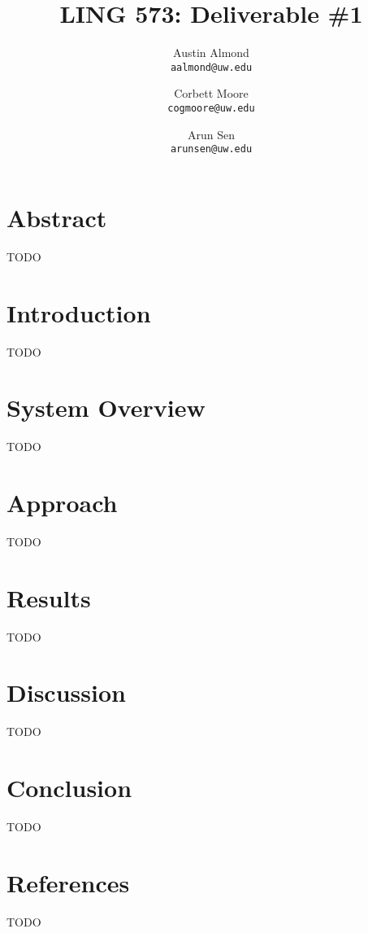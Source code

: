 \documentclass{article}
\title{LING 573: Deliverable \#1}
\author{
	Austin Almond\\
	\texttt{aalmond@uw.edu}
	\and
	Corbett Moore\\
	\texttt{cogmoore@uw.edu}
	\and
	Arun Sen\\
	\texttt{arunsen@uw.edu}
}
\begin{document}
	\maketitle

	\section*{Abstract}

	TODO

	\section*{Introduction}

	TODO

	\section*{System Overview}

	TODO

	\section*{Approach}

	TODO

	\section*{Results}

	TODO

	\section*{Discussion}

	TODO

	\section*{Conclusion}

	TODO

	\section*{References}

	TODO
\end{document}
